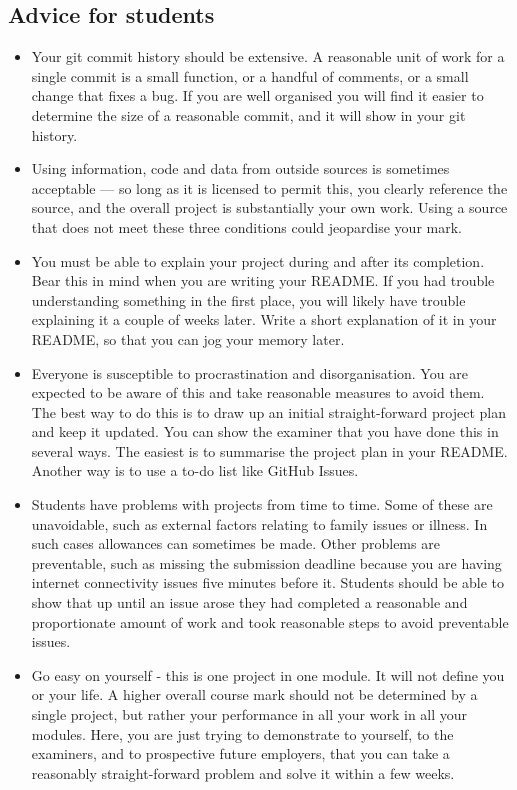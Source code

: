 \documentclass[12pt, a4paper, hidelinks]{scrartcl}
\begin{document}
\subsection*{Advice for students}
  \begin{itemize}
    \item
      Your git commit history should be extensive.
      A reasonable unit of work for a single commit is a small function, or a handful of comments, or a small change that fixes a bug.
      If you are well organised you will find it easier to determine the size of a reasonable commit, and it will show in your git history.
    \item
      Using information, code and data from outside sources is sometimes acceptable --- so long as it is licensed to permit this, you clearly reference the source, and the overall project is substantially your own work.
      Using a source that does not meet these three conditions could jeopardise your mark.
    \item
      You must be able to explain your project during and after its completion.
      Bear this in mind when you are writing your README.
      If you had trouble understanding something in the first place, you will likely have trouble explaining it a couple of weeks later.
      Write a short explanation of it in your README, so that you can jog your memory later.
    \item
      Everyone is susceptible to procrastination and disorganisation.
      You are expected to be aware of this and take reasonable measures to avoid them.
      The best way to do this is to draw up an initial straight-forward project plan and keep it updated.
      You can show the examiner that you have done this in several ways.
      The easiest is to summarise the project plan in your README.
      Another way is to use a to-do list like GitHub Issues.
    \item
      Students have problems with projects from time to time.
      Some of these are unavoidable, such as external factors relating to family issues or illness.
      In such cases allowances can sometimes be made.
      Other problems are preventable, such as missing the submission deadline because you are having internet connectivity issues five minutes before it.
      Students should be able to show that up until an issue arose they had completed a reasonable and proportionate amount of work and took reasonable steps to avoid preventable issues.
    \item
      Go easy on yourself - this is one project in one module.
      It will not define you or your life.
      A higher overall course mark should not be determined by a single project, but rather your performance in all your work in all your modules.
      Here, you are just trying to demonstrate to yourself, to the examiners, and to prospective future employers, that you can take a reasonably straight-forward problem and solve it within a few weeks.
  \end{itemize}


  
  
\end{document}
